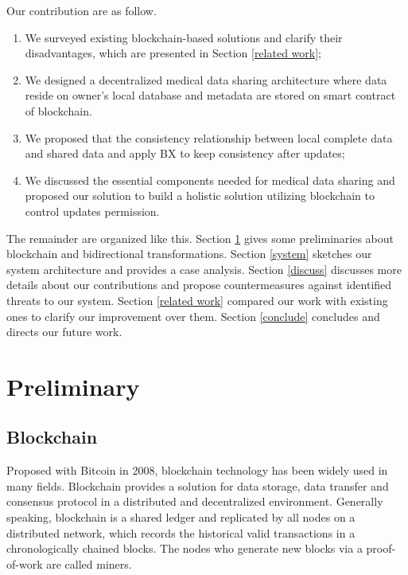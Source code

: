 \documentclass[conference]{IEEEtran}
\begin{document}
Our contribution are as follow.
\begin{enumerate}
	\item We surveyed existing blockchain-based solutions and clarify their disadvantages, which are presented in Section \ref{related work};
	\item We designed  a decentralized medical data sharing architecture where data reside on owner's local database and metadata are stored on smart contract of  blockchain.
	\item We proposed that the consistency relationship between local complete data and shared data and apply BX to keep consistency after updates;
	\item We discussed the essential components needed for medical data sharing and proposed our solution to build a holistic solution utilizing blockchain to control updates permission.
	
\end{enumerate}

The remainder are organized like this. Section \ref{preli} gives some preliminaries about blockchain and bidirectional transformations. Section \ref{system} sketches our system architecture and provides a case analysis. Section \ref{discuss} discusses more details about our contributions and propose countermeasures against identified threats to our system. Section \ref{related work} compared our work with existing ones to clarify our improvement over them. Section \ref{conclude} concludes and directs our future work.

\section{Preliminary}
\label{preli}

	\subsection{Blockchain}
	Proposed with Bitcoin \cite{nakamoto2008bitcoin} in 2008, blockchain technology has been widely used in many fields. Blockchain provides a solution for data storage, data transfer and consensus protocol in a distributed and decentralized environment. Generally speaking, blockchain is a shared ledger and replicated by all nodes on a distributed network, which records the historical valid transactions in a chronologically chained blocks. The nodes who generate new blocks via a proof-of-work are called miners.
	
\end{document}
